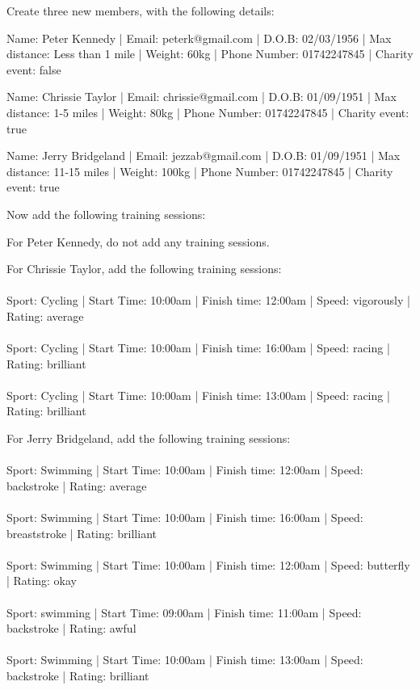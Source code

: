 \documentclass{article}[12pt,a4paper]
\begin{document}
{\setlength{\parindent}{0cm}
Create three new members, with the following details:

\begin{framed}
Name: Peter Kennedy | Email: peterk@gmail.com | D.O.B: 02/03/1956 | Max distance: Less than 1 mile | Weight: 60kg | Phone Number: 01742247845 | Charity event: false
\end{framed}

\begin{framed}
Name: Chrissie Taylor | Email: chrissie@gmail.com | D.O.B: 01/09/1951 | Max distance:  1-5 miles | Weight: 80kg | Phone Number: 01742247845 | Charity event: true
\end{framed}

\begin{framed}
Name: Jerry Bridgeland | Email: jezzab@gmail.com | D.O.B: 01/09/1951 | Max distance:  11-15 miles | Weight: 100kg | Phone Number: 01742247845 | Charity event: true
\end{framed}

Now add the following training sessions:

\begin{framed}
For Peter Kennedy, do not add any training sessions.
\end{framed}

\begin{framed}
For Chrissie Taylor, add the following training sessions:\\\\
Sport: Cycling | Start Time: 10:00am | Finish time: 12:00am | Speed: vigorously | Rating: average\\\\
Sport: Cycling | Start Time: 10:00am | Finish time: 16:00am | Speed: racing | Rating: brilliant\\\\
Sport: Cycling | Start Time: 10:00am | Finish time: 13:00am | Speed: racing | Rating: brilliant
\end{framed}

\begin{framed}
For Jerry Bridgeland, add the following training sessions:\\\\
Sport: Swimming | Start Time: 10:00am | Finish time: 12:00am | Speed: backstroke | Rating: average\\\\
Sport: Swimming | Start Time: 10:00am | Finish time: 16:00am | Speed: breaststroke | Rating: brilliant\\\\
Sport: Swimming | Start Time: 10:00am | Finish time: 12:00am | Speed: butterfly | Rating: okay\\\\
Sport: swimming | Start Time: 09:00am | Finish time: 11:00am | Speed: backstroke | Rating: awful\\\\
Sport: Swimming | Start Time: 10:00am | Finish time: 13:00am | Speed: backstroke | Rating: brilliant
\end{framed}

}
\end{document}
